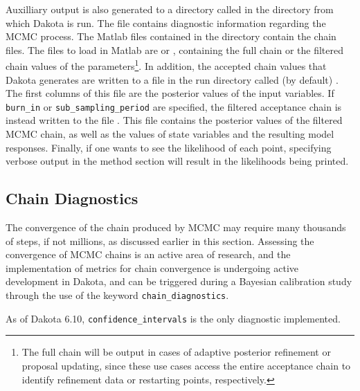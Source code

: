 Auxilliary output is also generated to a directory called
 in the directory from which Dakota is run.
The file  contains diagnostic information
regarding the MCMC process.  The Matlab files contained in the
 directory contain the chain files.  The
files to load in Matlab are  or
, containing the full chain or the filtered
chain values of the parameters\footnote{The full chain will be output
  in cases of adaptive posterior refinement or proposal updating,
  since these use cases access the entire acceptance chain to identify
  refinement data or restarting points, respectively.}.  In addition,
the accepted chain values that Dakota generates are written to a file
in the run directory called (by default)
. The first columns of this file are
the posterior values of the input variables. If \texttt{burn\_in} or
\texttt{sub\_sampling\_period} are specified, the filtered acceptance
chain is instead written to the file
. This file contains the posterior
values of the filtered MCMC chain, as well as the values of state
variables and the resulting model responses. Finally, if one wants to
see the likelihood of each point, specifying verbose output in the
method section will result in the likelihoods being printed.

\subsection{Chain Diagnostics}

The convergence of the chain produced by MCMC may require many
thousands of steps, if not millions, as discussed earlier in this
section. Assessing the convergence of MCMC chains is an active area of
research, and the implementation of metrics for chain convergence is
undergoing active development in Dakota, and can be triggered during a
Bayesian calibration study through the use of the keyword
\texttt{chain\_diagnostics}. 

As of Dakota 6.10,  \texttt{confidence\_intervals} is the only
diagnostic implemented. 

